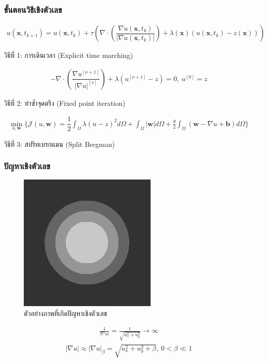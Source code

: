 \documentclass[xcolor=dvipsnames, xetex,serif]{beamer}
\numberwithin{equation}{section}
\begin{document}
	\begin{frame}
		\frametitle{ขั้นตอนวิธีเชิงตัวเลข}
		\begin{align*}
			u(\mathbf{x},t_{k+1})=u(\mathbf{x},t_{k})+\tau\left(\nabla \cdot\left(\dfrac{\nabla u (\mathbf{x},t_k)}{| \nabla u (\mathbf{x},t_k) | }\right) + \lambda(\mathbf{x})(u (\mathbf{x},t_k)-z(\mathbf{x})) \right)
		\end{align*}
		\begin{center}
		\textcolor{PineGreen}{วิธีที่ 1:} การเดินเวลา (Explicit time marching)
		\end{center}
		\begin{align*}
			- \nabla\cdot\left(\dfrac{\nabla u^{[\nu+1]}}{{| \nabla u |}^{[v]} }\right) + \lambda(u^{[\nu+1]}-z)  = 0,\ u^{[0]}=z
		\end{align*}
		\begin{center}
			\textcolor{PineGreen}{วิธีที่ 2:} ทำซ้ำจุดตรึง (Fixed point iteration)
		\end{center}
		\begin{align*}
			\min_{u,\boldsymbol{w}} \{ \mathcal{J}(u,\boldsymbol{w}) = \dfrac{1}{2} \int_{\Omega} \lambda(u-z)^2 d\Omega +  \int_{\Omega}  |\boldsymbol{w}|  d\Omega + \frac{\theta}{2} \int_{\Omega} (\boldsymbol{w} - \nabla u + \boldsymbol{b}) d\Omega \}
		\end{align*}
		\begin{center}
			\textcolor{PineGreen}{วิธีที่ 3:} สปริทเบรกแมน (Split Bregman)
		\end{center}
	\end{frame} 
	\begin{frame}
		\frametitle{ปัญหาเชิงตัวเลข}
			\begin{figure}[H]
			\centering
			\includegraphics[width=0.2\linewidth]{images/grad_problem.png}
			\caption{ตัวอย่างภาพที่เกิดปัญหาเชิงตัวเลข}
			\label{image:rgb-space}
			\end{figure}
			\begin{align*}
			\tfrac{1}{| \nabla u |}=\tfrac{1}{\sqrt{u_x^2+u_y^2}} \rightarrow \infty
			\end{align*}
			\begin{align*}
			|\nabla u| \approx| \nabla u |_\beta=\sqrt{u_x^2+u_y^2+\beta},\ 0< \beta \ll 1
			\end{align*}
	\end{frame}
\end{document}
